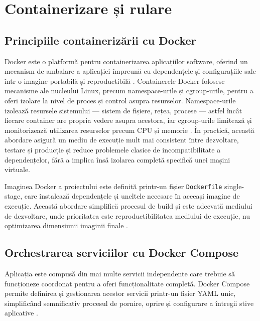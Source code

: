 \documentclass[12pt, a4paper, oneside, romanian]{teza-upb}
\begin{document}
\section{Containerizare și rulare}

\subsection{Principiile containerizării cu Docker}

Docker este o platformă pentru containerizarea aplicațiilor software, 
oferind un mecanism de ambalare a aplicației împreună cu dependențele 
și configurațiile sale într-o imagine portabilă și reproductibilă 
\cite{docker_doc}. Containerele Docker folosesc mecanisme ale nucleului Linux, precum namespace-urile și cgroup-urile, pentru a oferi izolare la nivel de proces și control asupra resurselor. Namespace-urile izolează resursele sistemului — sistem de fișiere, rețea, procese — astfel încât fiecare container are propria 
vedere asupra acestora, iar cgroup-urile limitează și monitorizează utilizarea 
resurselor precum CPU și memorie \cite{docker_doc}. În practică, această abordare asigură un mediu de execuție mult mai consistent între dezvoltare, testare și producție și reduce problemele clasice de incompatibilitate a dependențelor, fără a implica însă izolarea completă specifică unei mașini virtuale.

Imaginea Docker a proiectului este definită printr-un fișier 
\texttt{Dockerfile} single-stage, care instalează dependențele și 
uneltele necesare în aceeași imagine de execuție. Această abordare 
simplifică procesul de build și este adecvată mediului de dezvoltare, 
unde prioritatea este reproductibilitatea mediului de execuție, nu 
optimizarea dimensiunii imaginii finale \cite{docker_doc}.

\subsection{Orchestrarea serviciilor cu Docker Compose}

Aplicația este compusă din mai multe servicii independente care trebuie să funcționeze coordonat pentru a oferi funcționalitate completă. Docker Compose permite definirea și gestionarea acestor servicii printr-un fișier YAML unic, simplificând semnificativ procesul de pornire, oprire și configurare a întregii stive aplicative \cite{docker_compose_doc}.
\end{document}

